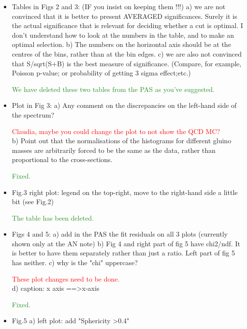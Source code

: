 \documentclass[paper=a4, fontsize=11pt]{scrartcl}
\begin{document}
\begin{itemize}
\item Tables in Figs 2 and 3: (IF you insist on keeping them !!!) 
a) we are not convinced that it is better to present AVERAGED significances. 
Surely it is the actual significance that is relevant for deciding whether 
a cut is optimal. I don't understand how to look at the numbers in the table, 
and to make an optimal selection. 
b) The numbers on the horizontal axis should be at the centres of the bins, 
rather than at the bin edges. 
c) we are also not convinced that S/sqrt(S+B) is the best measure of 
significance. (Compare, for example, Poisson p-value; or probability of 
getting 3 sigma effect;etc.) 

\textcolor{ForestGreen}{We have deleted these two tables from the PAS as you've suggested.}\\


\item Plot in Fig 3: 
a) Any comment on the discrepancies on the left-hand side of the spectrum? 

\textcolor{Red}{Claudia, maybe you could change the plot to not show the QCD MC?}\\

b) Point out that the normalisations of the histograms for different gluino 
masses are arbitrarily forced to be the same as the data, rather than 
proportional to the cross-sections. 

\textcolor{ForestGreen}{Fixed.}\\


\item Fig.3 
right plot: legend on the top-right, move to the right-hand side a little 
bit (see Fig.2) 

\textcolor{ForestGreen}{The table has been deleted.}\\


\item Figs 4 and 5: 
a) add in the PAS the fit residuals on all 3 plots (currently shown only at 
the AN note) 
b) Fig 4 and right part of fig 5 have chi2/ndf. It is better to have them 
separately rather than just a ratio. Left part of fig 5 has neither. 
c) why is the "chi" uppercase? 

\textcolor{Red}{These plot changes need to be done.}\\

d) caption: x axis ==\textgreater x-axis 

\textcolor{ForestGreen}{Fixed.}\\

\item Fig.5 
a) left plot: 
add "Sphericity \textgreater 0.4" 


\end{itemize}
\end{document}
